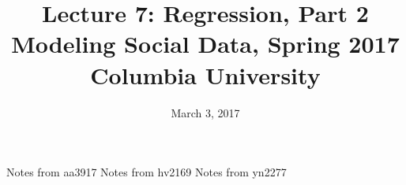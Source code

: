 \documentclass{article}
\title{
Lecture 7: Regression, Part 2 \\  %
Modeling Social Data, Spring 2017 \\   %
Columbia University                    %
}
\date{March 3, 2017}                %
\makeatletter
\let\org@subfile
\renewcommand*{}[1]{%
  \filename@parse{#1}%
  \expandafter
  \graphicspath\expandafter{\expandafter{\filename@area}}%
  \org@subfile{#1}%
}
\makeatother
\begin{document}
\maketitle


\pagebreak \newpage \noindent\Huge{Notes from aa3917} \normalsize \setcounter{section}{0} 
\pagebreak \newpage \noindent\Huge{Notes from hv2169} \normalsize \setcounter{section}{0} 
\pagebreak \newpage \noindent\Huge{Notes from yn2277} \normalsize \setcounter{section}{0} 
\end{document}
